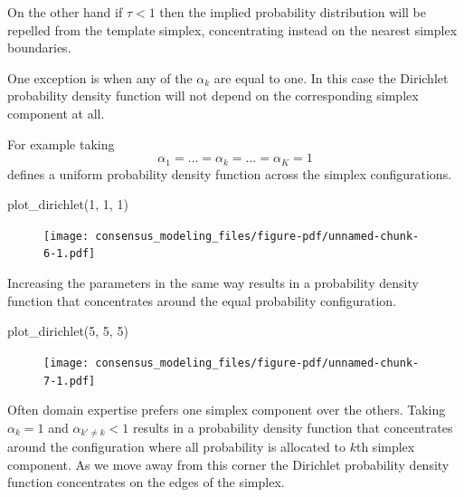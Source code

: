 \documentclass[
  letterpaper,
  DIV=11,
  numbers=noendperiod]{scrartcl}
\newenvironment{Shaded}{\begin{snugshade}}{\end{snugshade}}
\newcommand{\DecValTok}[1]{\textcolor[rgb]{0.68,0.00,0.00}{#1}}
\newcommand{\FunctionTok}[1]{\textcolor[rgb]{0.28,0.35,0.67}{#1}}
\newcommand{\NormalTok}[1]{\textcolor[rgb]{0.00,0.23,0.31}{#1}}
\begin{document}
On the other hand if \(\tau < 1\) then the implied probability
distribution will be repelled from the template simplex, concentrating
instead on the nearest simplex boundaries.

One exception is when any of the \(\alpha_{k}\) are equal to one. In
this case the Dirichlet probability density function will not depend on
the corresponding simplex component at all.

For example taking \[
\alpha_{1} = \ldots = \alpha_{k} = \ldots = \alpha_{K} = 1
\] defines a uniform probability density function across the simplex
configurations.

\begin{Shaded}
\begin{Highlighting}[]
\FunctionTok{plot\_dirichlet}\NormalTok{(}\DecValTok{1}\NormalTok{, }\DecValTok{1}\NormalTok{, }\DecValTok{1}\NormalTok{)}
\end{Highlighting}
\end{Shaded}

\begin{figure}[H]

{\centering \texttt{[image: consensus\_modeling\_files/figure-pdf/unnamed-chunk-6-1.pdf]}

}

\end{figure}

Increasing the parameters in the same way results in a probability
density function that concentrates around the equal probability
configuration.

\begin{Shaded}
\begin{Highlighting}[]
\FunctionTok{plot\_dirichlet}\NormalTok{(}\DecValTok{5}\NormalTok{, }\DecValTok{5}\NormalTok{, }\DecValTok{5}\NormalTok{)}
\end{Highlighting}
\end{Shaded}

\begin{figure}[H]

{\centering \texttt{[image: consensus\_modeling\_files/figure-pdf/unnamed-chunk-7-1.pdf]}

}

\end{figure}

Often domain expertise prefers one simplex component over the others.
Taking \(\alpha_{k} = 1\) and \(\alpha_{k' \ne k} < 1\) results in a
probability density function that concentrates around the configuration
where all probability is allocated to \(k\)th simplex component. As we
move away from this corner the Dirichlet probability density function
concentrates on the edges of the simplex.
\end{document}
